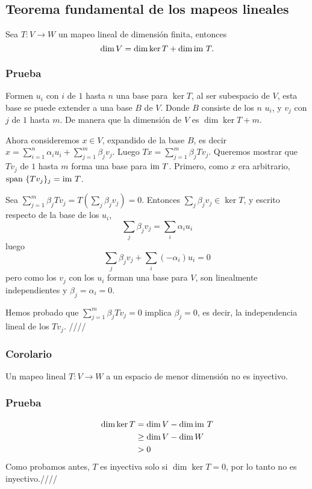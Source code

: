 \documentclass{article}
\begin{document}
\subsection{Teorema fundamental de los mapeos lineales}
Sea $T: V\rightarrow W$ un mapeo lineal de dimensión finita, entonces
$$\dim V = \dim\ker T + \dim\text{im } T.$$

\subsubsection*{Prueba}
Formen $u_i$ con $i$ de $1$ hasta $n$ una base para $\ker T$,
al ser subespacio de $V$, esta base se puede extender a una base $B$
de $V$. Donde $B$ consiste de los $n$ $u_i$, y
$v_j$ con $j$ de $1$ hasta $m$. De manera que la dimensión de $V$
es $\dim\ker T+m$.

Ahora consideremos $x\in V$, expandido de la base $B$, es decir\\
$x= \sum^n_{i=1}\alpha_iu_i + \sum^m_{j=1}\beta_jv_j$. Luego
$Tx = \sum^m_{j=1}\beta_jTv_j$. Queremos mostrar que $Tv_j$ de
$1$ hasta $m$ forma una base para $\text{im } T$. Primero, como $x$ era arbitrario, $\text{span } \{Tv_j\}_j = \text{im } T$.

Sea $\sum^m_{j=1}\beta_jTv_j = T(\sum_j\beta_jv_j)=0$.
Entonces $\sum_j\beta_jv_j \in \ker T$, y escrito respecto de la base
de los $u_i$,
$$\sum_j\beta_jv_j = \sum_i\alpha_iu_i$$
luego
$$\sum_j\beta_jv_j + \sum_i(-\alpha_i)u_i = 0$$
pero como los $v_j$ con los $u_i$ forman una base para $V$,
son linealmente independientes y $\beta_j=\alpha_i=0$.

Hemos probado que $\sum^m_{j=1}\beta_jTv_j = 0$ implica
$\beta_j = 0$, es decir, la independencia lineal de los $Tv_j$.
\hfill ////

\subsubsection{Corolario}
Un mapeo lineal $T:V\rightarrow W$ a un espacio de menor dimensión no es inyectivo.
\subsubsection*{Prueba}
\begin{align*}
\dim\ker T &= \dim V - \dim\text{im } T\\
    &\geq \dim V - \dim W\\
    &> 0
\end{align*}
Como probamos antes, $T$ es inyectiva solo si $\dim \ker T = 0$,
por lo tanto no es inyectivo.\hfill ////
\end{document}
